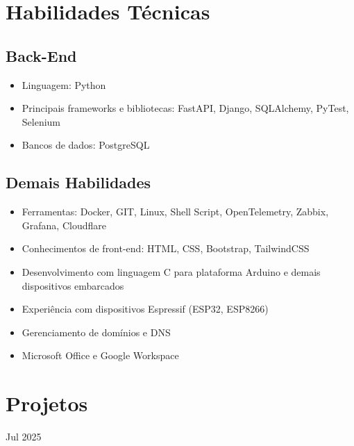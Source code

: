 \documentclass{cv}
\begin{document}
\pagestyle{empty}

\maketitle

\section{Habilidades Técnicas}

\subsection{Back-End}

\begin{itemize}
  \item Linguagem: Python
  \item Principais frameworks e bibliotecas: FastAPI, Django, SQLAlchemy,
    PyTest, Selenium
  \item Bancos de dados: PostgreSQL
\end{itemize}

\subsection{Demais Habilidades}

\begin{itemize}
  \item Ferramentas: Docker, GIT, Linux, Shell Script, OpenTelemetry, Zabbix, Grafana, Cloudflare
  \item Conhecimentos de front-end: HTML, CSS, Bootstrap, TailwindCSS
  \item Desenvolvimento com linguagem C para plataforma Arduino e demais dispositivos embarcados
  \item Experiência com dispositivos Espressif (ESP32, ESP8266)
  \item Gerenciamento de domínios e DNS
  \item Microsoft Office e Google Workspace
\end{itemize}

\section{Projetos}

\hfill{Jul 2025}\\
\\
\vspace{0.15cm}
\end{document}
